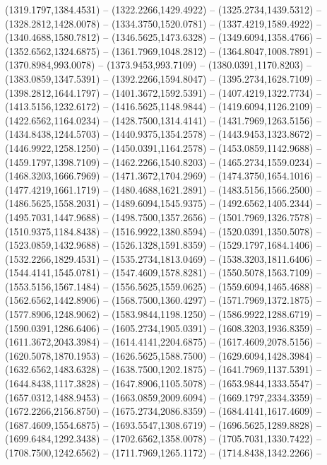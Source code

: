 \begin{scope}[y=0.80pt, x=0.80pt, yscale=-1.000000, xscale=1.000000, inner sep=0pt, outer sep=0pt]
    (1319.1797,1384.4531) -- (1322.2266,1429.4922) -- (1325.2734,1439.5312) --
    (1328.2812,1428.0078) -- (1334.3750,1520.0781) -- (1337.4219,1589.4922) --
    (1340.4688,1580.7812) -- (1346.5625,1473.6328) -- (1349.6094,1358.4766) --
    (1352.6562,1324.6875) -- (1361.7969,1048.2812) -- (1364.8047,1008.7891) --
    (1370.8984,993.0078) -- (1373.9453,993.7109) -- (1380.0391,1170.8203) --
    (1383.0859,1347.5391) -- (1392.2266,1594.8047) -- (1395.2734,1628.7109) --
    (1398.2812,1644.1797) -- (1401.3672,1592.5391) -- (1407.4219,1322.7734) --
    (1413.5156,1232.6172) -- (1416.5625,1148.9844) -- (1419.6094,1126.2109) --
    (1422.6562,1164.0234) -- (1428.7500,1314.4141) -- (1431.7969,1263.5156) --
    (1434.8438,1244.5703) -- (1440.9375,1354.2578) -- (1443.9453,1323.8672) --
    (1446.9922,1258.1250) -- (1450.0391,1164.2578) -- (1453.0859,1142.9688) --
    (1459.1797,1398.7109) -- (1462.2266,1540.8203) -- (1465.2734,1559.0234) --
    (1468.3203,1666.7969) -- (1471.3672,1704.2969) -- (1474.3750,1654.1016) --
    (1477.4219,1661.1719) -- (1480.4688,1621.2891) -- (1483.5156,1566.2500) --
    (1486.5625,1558.2031) -- (1489.6094,1545.9375) -- (1492.6562,1405.2344) --
    (1495.7031,1447.9688) -- (1498.7500,1357.2656) -- (1501.7969,1326.7578) --
    (1510.9375,1184.8438) -- (1516.9922,1380.8594) -- (1520.0391,1350.5078) --
    (1523.0859,1432.9688) -- (1526.1328,1591.8359) -- (1529.1797,1684.1406) --
    (1532.2266,1829.4531) -- (1535.2734,1813.0469) -- (1538.3203,1811.6406) --
    (1544.4141,1545.0781) -- (1547.4609,1578.8281) -- (1550.5078,1563.7109) --
    (1553.5156,1567.1484) -- (1556.5625,1559.0625) -- (1559.6094,1465.4688) --
    (1562.6562,1442.8906) -- (1568.7500,1360.4297) -- (1571.7969,1372.1875) --
    (1577.8906,1248.9062) -- (1583.9844,1198.1250) -- (1586.9922,1288.6719) --
    (1590.0391,1286.6406) -- (1605.2734,1905.0391) -- (1608.3203,1936.8359) --
    (1611.3672,2043.3984) -- (1614.4141,2204.6875) -- (1617.4609,2078.5156) --
    (1620.5078,1870.1953) -- (1626.5625,1588.7500) -- (1629.6094,1428.3984) --
    (1632.6562,1483.6328) -- (1638.7500,1202.1875) -- (1641.7969,1137.5391) --
    (1644.8438,1117.3828) -- (1647.8906,1105.5078) -- (1653.9844,1333.5547) --
    (1657.0312,1488.9453) -- (1663.0859,2009.6094) -- (1669.1797,2334.3359) --
    (1672.2266,2156.8750) -- (1675.2734,2086.8359) -- (1684.4141,1617.4609) --
    (1687.4609,1554.6875) -- (1693.5547,1308.6719) -- (1696.5625,1289.8828) --
    (1699.6484,1292.3438) -- (1702.6562,1358.0078) -- (1705.7031,1330.7422) --
    (1708.7500,1242.6562) -- (1711.7969,1265.1172) -- (1714.8438,1342.2266) --

\end{scope}

